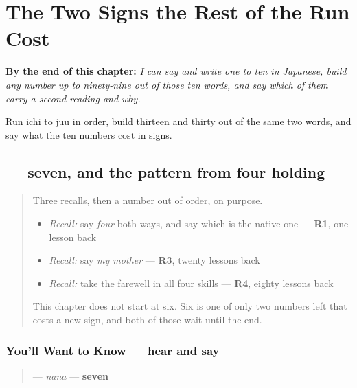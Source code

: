 
\chapter{The Two Signs the Rest of the Run Cost}
\label{ch:ja-numbers-six-to-ten}

\begin{chapteropening}
\textbf{By the end of this chapter:} \emph{I can say and write one to ten in Japanese, build any number up to ninety-nine out of those ten words, and say which of them carry a second reading and why.}

Run ichi to juu in order, build thirteen and thirty out of the same two words, and say what the ten numbers cost in signs.
\end{chapteropening}

\section[\texorpdfstring{\ja{なな} (nana)}{なな (nana)}]{ — seven, and the pattern from four holding}

\label{lesson:JA-C15-nana}



\begin{quote}
Three recalls, then a number out of order, on purpose.

\begin{itemize}
\raggedright
  \item \emph{Recall:} say \emph{four} both ways, and say which is the native one — \textbf{R1}, one lesson back
  \item \emph{Recall:} say \emph{my mother} — \textbf{R3}, twenty lessons back
  \item \emph{Recall:} take the farewell in all four skills — \textbf{R4}, eighty lessons back
\end{itemize}

This chapter does not start at six. Six is one of only two numbers left that costs a new sign, and both of those wait until the end.
\end{quote}

\subsection*{You'll Want to Know — hear and say}
\begin{quote}
\textbf{} — \emph{nana} — \textbf{seven}
\end{quote}

